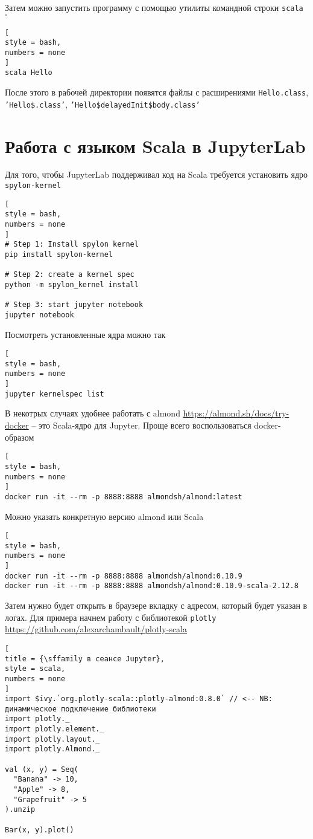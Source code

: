 \documentclass[%
	11pt,
	a4paper,
	utf8,
		]{article}
\begin{document}
Затем можно запустить программу с помощью утилиты командной строки \texttt{scala} $ {}^{\circ} $
\begin{lstlisting}[
style = bash,
numbers = none	
]
scala Hello
\end{lstlisting}

После этого в рабочей директории появятся файлы с расширениями \texttt{Hello.class}, \texttt{'Hello\$.class'}, \texttt{'Hello\$delayedInit\$body.class'}

\section{Работа с языком Scala в JupyterLab}

Для того, чтобы JupyterLab поддерживал код на Scala требуется установить ядро \texttt{spylon-kernel}
\begin{lstlisting}[
style = bash,
numbers = none	
]
# Step 1: Install spylon kernel
pip install spylon-kernel

# Step 2: create a kernel spec
python -m spylon_kernel install

# Step 3: start jupyter notebook 
jupyter notebook
\end{lstlisting}

Посмотреть установленные ядра можно так
\begin{lstlisting}[
style = bash,
numbers = none	
]
jupyter kernelspec list
\end{lstlisting}

В некотрых случаях удобнее работать с almond \url{https://almond.sh/docs/try-docker} -- это Scala-ядро для Jupyter. Проще всего воспользоваться docker-образом
\begin{lstlisting}[
style = bash,
numbers = none	
]
docker run -it --rm -p 8888:8888 almondsh/almond:latest
\end{lstlisting}

Можно указать конкретную версию almond или Scala
\begin{lstlisting}[
style = bash,
numbers = none	
]
docker run -it --rm -p 8888:8888 almondsh/almond:0.10.9
docker run -it --rm -p 8888:8888 almondsh/almond:0.10.9-scala-2.12.8
\end{lstlisting}

Затем нужно будет открыть в браузере вкладку с адресом, который будет указан в логах. Для примера начнем работу с библиотекой \texttt{plotly} \url{https://github.com/alexarchambault/plotly-scala}
\begin{lstlisting}[
title = {\sffamily в сеансе Jupyter},
style = scala,
numbers = none	
]
import $ivy.`org.plotly-scala::plotly-almond:0.8.0` // <-- NB: динамическое подключение библиотеки
import plotly._
import plotly.element._
import plotly.layout._
import plotly.Almond._

val (x, y) = Seq(
  "Banana" -> 10,
  "Apple" -> 8,
  "Grapefruit" -> 5
).unzip

Bar(x, y).plot()
\end{lstlisting}
\end{document}
